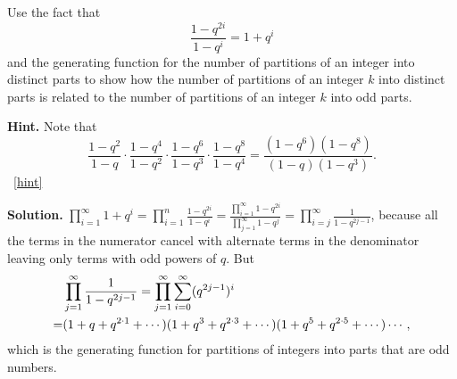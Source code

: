 \documentclass{book}
\begin{document}
\setcounter{project}{324}
\addtocounter{project}{-1}
\begin{activity}[]\label{activity-317}
\hypertarget{p-1632}{}%
Use the fact that%
\begin{equation*}
\frac{1-q^{2i}}{1-q^i}= 1+q^i
\end{equation*}
and the generating function for the number of partitions of an integer into distinct parts to show how the number of partitions of an integer \(k\) into distinct parts is related to the number of partitions of an integer \(k\) into odd parts.%
\par\smallskip%
\noindent\textbf{Hint.}\hypertarget{hint-215}{}\quad%
\hypertarget{p-1633}{}%
Note that%
\begin{equation*}
\frac{1-q^2}{1-q}\cdot \frac{1-q^4}{1-q^2}\cdot \frac{1-q^6}{1-q^3}\cdot \frac{1-q^8}{1-q^4} = \frac{(1-q^6)(1-q^8)}{(1-q)(1-q^3)} \text{.}
\end{equation*}
%
~\hfill{\tiny\hyperlink{a-324}{[hint]}\hypertarget{q-324}{}}\par\smallskip%
\noindent\textbf{Solution.}\hypertarget{solution-232}{}\quad%
\hypertarget{p-1634}{}%
\(\displaystyle\prod_{i=1}^\infty 1+q^i=\prod_{i=1}^n \frac{1-q^{2i}}{1-q^i}=\frac{\prod_{i=1}^\infty1-q^{2i}}{\prod_{j=1}^\infty 1-q^j} =\prod_{i=j}^\infty \frac{1}{1-q^{2j-1}}\), because all the terms in the numerator cancel with alternate terms in the denominator leaving only terms with odd powers of \(q\). But%
\begin{align*}
& \prod_{j=1}^\infty\frac{1}{1-q^{2j-1}} =  \prod_{j=1}^\infty \sum_{i=0}^\infty (q^{2j-1})^i\\
=& (1+q+q^{2\cdot1}+\cdots)(1+q^3+q^{2\cdot3}+\cdots)(1
+q^5+q^{2\cdot5}+\cdots)\cdots,
\end{align*}
which is the generating function for partitions of integers into parts that are odd numbers.%
\end{activity}
\end{document}
